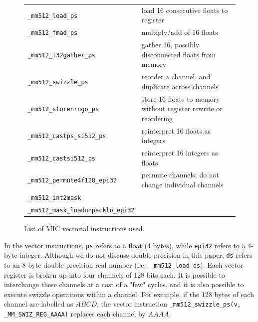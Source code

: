 \documentclass[10pt,conference,compsocconf]{IEEEtran}
\def\blue#1{\textbf{\textcolor{blue}{#1}}}
\def\qes#1{{\blue{*** For Erik: #1 ***}}}
\def\ttt#1{{\tt #1}}
\def\qes#1{}
\begin{document}
\def\loadps{\ttt{\_mm512\_load\_ps}}
\def\loadds{\ttt{\_mm512\_load\_ds}}
\def\fmadps{\ttt{\_mm512\_fmad\_ps}}
\def\gatherps{\ttt{\_mm512\_i32gather\_ps}}
\def\swizzleps{\ttt{\_mm512\_swizzle\_ps}}
\def\storenrngops{\ttt{\_mm512\_storenrngo\_ps}}
\def\castsi{\ttt{\_mm512\_castsi512\_ps}}
\def\permute{\ttt{\_mm512\_permute4f128\_epi32}}
\def\intmask{\ttt{\_mm512\_int2mask}}
\def\loadunpack{\ttt{\_mm512\_mask\_loadunpacklo\_epi32}}
\def\castitops{\ttt{\_mm512\_castsi512\_ps}}
\def\castpstoi{\ttt{\_mm512\_castps\_si512\_ps}}

\begin{figure}
  \begin{center}
    \begin{tabular}{|l|l|}
      \hline
      \loadps &  load 16 consecutive floats to register\\
      \fmadps &  multiply/add of 16 floats\\
      \gatherps &  gather 16, possibly disconnected floats from memory\\
      \swizzleps &  reorder a channel, and duplicate across channels\\
      \storenrngops &  store 16 floats to memory without register rewrite or reordering\\
      \castpstoi & reinterpret 16 floats as integers\\
      \castitops & reinterpret 16 integers as floats\\
      \permute &  permute channels; do not change individual channels\\
      \intmask &  \\
      \loadunpack &  \\
      \hline
    \end{tabular}
  \end{center}
  \caption{List of MIC vectorial instructions used.}
\label{fig:MIC-vect-instr}
\end{figure}
In the vector instructions, \ttt{ps} refers to a float (4 bytes),
while \ttt{epi32} refers to a 4-byte integer. Although we do not
discuss double precision in this paper, \ttt{ds} refers to an 8 byte
double precision real number (i.e., \loadds).  Each vector register is
broken up into four channels of 128 bits each. It is possible to
interchange these channels at a cost of a "few" \qes{exact numbers?}
cycles, and it is also possible to execute swizzle operations within a
channel. For example, if the 128 bytes of each channel are labelled as
$ABCD$, the vector instruction \ttt{\_mm512\_swizzle\_ps(v,
  \_MM\_SWIZ\_REG\_AAAA)} replaces each channel by $AAAA$.
\end{document}
